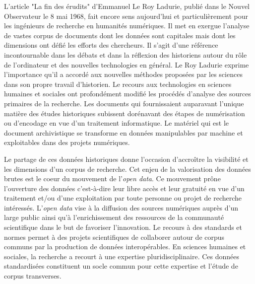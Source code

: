 \documentclass[a4paper, 12pt, twoside]{book}
\begin{document}
L'article "La fin des érudits" d'Emmanuel Le Roy Ladurie, publié dans le Nouvel Observateur le 8 mai 1968, fait encore sens aujourd'hui et particulièrement pour les ingénieurs de recherche en humanités numériques. Il met en exergue l'analyse de vastes corpus de documents dont les données sont capitales mais dont les dimensions ont défié les efforts des chercheurs. Il s'agit d'une référence incontournable dans les débats et dans la réflexion des historiens autour du rôle de l'ordinateur et des nouvelles technologies en général. Le Roy Ladurie exprime l'importance qu'il a accordé aux nouvelles méthodes proposées par les sciences dans son propre travail d'historien. Le recours aux technologies en sciences humaines et sociales ont profondément modifié les procédés d'analyse des sources primaires de la recherche. Les documents qui fournissaient auparavant l'unique matière des études historiques subissent dorénavant des étapes de numérisation ou d'encodage en vue d'un traitement informatique. Le matériel qui est le document archivistique se transforme en données manipulables par machine et exploitables dans des projets numériques. 

Le partage de ces données historiques donne l'occasion d'accroître la visibilité et les dimensions d'un corpus de recherche. Cet enjeu de la valorisation des données brutes est le coeur du mouvement de l'\textit{open data}. Ce mouvement prône l'ouverture des données c'est-à-dire leur libre accès et leur gratuité en vue d'un traitement et/ou d'une exploitation par toute personne ou projet de recherche intéressés. L'\textit{open data} vise à la diffusion des sources numériques auprès d'un large public ainsi qu'à l'enrichissement des ressources de la communauté scientifique dans le but de favoriser l'innovation. Le recours à des standards et normes permet à des projets scientifiques de collaborer autour de corpus communs par la production de données interopérables. En sciences humaines et sociales, la recherche a recourt à une expertise pluridisciplinaire. Ces données standardisées constituent un socle commun pour cette expertise et l'étude de corpus transverses.
\end{document}
